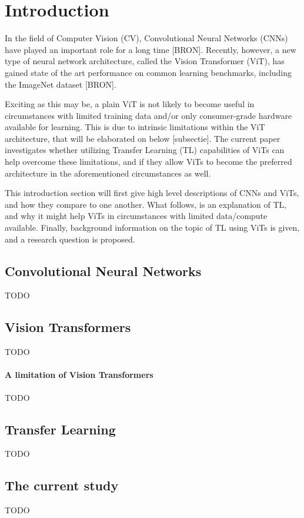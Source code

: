\section{Introduction}
In the field of Computer Vision (CV), Convolutional Neural Networks (CNNs) have played an important role for a long time [BRON]. Recently, however, a new type of neural network architecture, called the Vision Transformer (ViT), has gained state of the art performance on common learning benchmarks, including the ImageNet dataset [BRON].

Exciting as this may be, a plain ViT is not likely to become useful in circumstances with limited training data and/or only consumer-grade hardware available for learning. This is due to intrinsic limitations within the ViT architecture, that will be elaborated on below [subsectie]. The current paper investigates whether utilizing Transfer Learning (TL) capabilities of ViTs can help overcome these limitations, and if they allow ViTs to become the preferred architecture in the aforementioned circumstances as well.

This introduction section will first give high level descriptions of CNNs and ViTs, and how they compare to one another. What follows, is an explanation of TL, and why it might help ViTs in circumstances with limited data/compute available. Finally, background information on the topic of TL using ViTs is given, and a research question is proposed.

\subsection{Convolutional Neural Networks}
TODO

\subsection{Vision Transformers}
TODO

\paragraph{A limitation of Vision Transformers}
TODO


\subsection{Transfer Learning}
TODO

\subsection{The current study}
TODO
